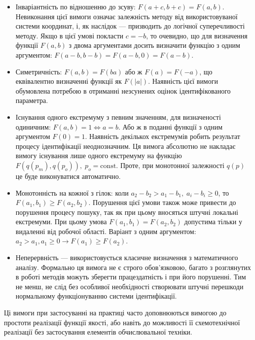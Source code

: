 \begin{itemize}

  \item
    Інваріантність по відношенню до зсуву:
    $F(a+c,b+c) = F(a,b)$.
    Невиконання цієї вимоги означає залежність методу від
    використовуваної системи координат, і, як наслідок --- призводить
    до логічної суперечливості методу. Якщо в цієї умові покласти
    $c = -b$, то очевидно, що для визначення функції
    $F(a,b)$ з двома аргументами досить визначити функцію з одним
    аргументом: $F(a-b,b-b) = F(a-b,0) = F(a-b)$.

  \item
    Симетричність:
    $F(a, b) = F(b a)$ або ж
    $F(a) = F(-a)$, що еквівалентно визначенні функції як
    $F(|a|)$. Наявність цієї вимоги обумовлена потребою в отриманні
    незсунених оцінок ідентифікованого параметра.

  \item
    Існування одного екстремуму
    з певним значенням, для визначеності одиничним:
    $F(a,b) = 1  \Leftrightarrow a = b$.
    Або ж в поданні функції з одним аргументом
    $F(0) = 1$. Наявність декількох екстремумів робить результат
    процесу ідентифікації неоднозначним. Ця вимога абсолютно не
    накладає вимогу існування лише одного екстремуму на функцію
    $F(q(p_m), q(p_o)), \; p_o = \mathrm{const}$. Проте, при монотонної залежності
    $q(p)$ це буде виконуватися автоматично.

  \item
    Монотонність на кожної з гілок:
    коли $a_2-b_2 > a_1-b_1, \; a_i-b_i \ge 0$, то $F(a_1,b_1) \ge F(a_2,b_2)$.
    Порушення цієї умови також може привести до порушення
    процесу пошуку, так як при цьому вносяться штучні локальні
    екстремуми. При цьому умова
    $F(a_1, b_1) = F(a_2,b_2)$ допустима тільки у видаленні від робочої
    області. Варіант з одним аргументом:
    $a_2 > a_1, a_1 \ge 0 \to F(a_1) \ge F(a_2)$.

  \item
    Неперервність ---
    використовується класичне визначення з математичного
    аналізу. Формально ця вимога не є строго обов'язковою, багато з
    розглянутих в роботі методів можуть зберегти працездатність
    і при його порушенні. Тим не менш, не слід без особливої
    необхідності створювати штучні перешкоди нормальному
    функціонуванню системи ідентифікації.

\end{itemize}

Ці вимоги при застосуванні на практиці часто доповнюються
вимогою до простоти реалізації функції якості, або навіть до
можливості її схемотехнічної реалізації без застосування
елементів обчислювальної техніки.

